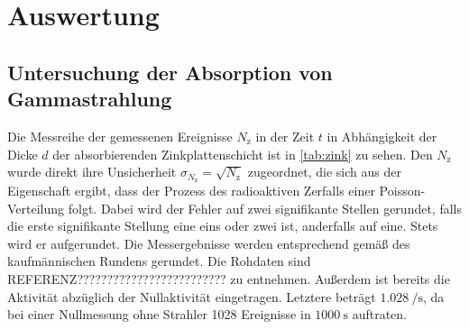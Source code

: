 \section{Auswertung}
\label{sec:Auswertung}

\subsection{Untersuchung der Absorption von Gammastrahlung}
\label{subsec:absorption}

Die Messreihe der gemessenen Ereignisse $N_\text{z}$ in der Zeit $t$ in Abhängigkeit der
Dicke $d$ der absorbierenden Zinkplattenschicht ist in \ref{tab:zink} zu sehen.
Den $N_\text{z}$ wurde direkt ihre Unsicherheit $\sigma_{N_\mathrm{z}} = \sqrt{N_\mathrm{z}}$
zugeordnet, die sich aus der Eigenschaft ergibt, dass der Prozess des radioaktiven Zerfalls
einer Poisson-Verteilung folgt. Dabei wird der Fehler auf zwei signifikante Stellen
gerundet, falls die erste signifikante Stellung eine eins oder zwei ist, anderfalls auf eine.
Stets wird er aufgerundet. Die Messergebnisse werden entsprechend gemäß des kaufmännischen
Rundens gerundet. Die Rohdaten sind REFERENZ????????????????????????? zu entnehmen.
Außerdem ist bereits die Aktivität abzüglich der Nullaktivität eingetragen.
Letztere beträgt $\SI{1.028}{\per\second}$, da bei einer Nullmessung ohne Strahler
1028 Ereignisse in $\SI{1000}{\second}$ auftraten.

